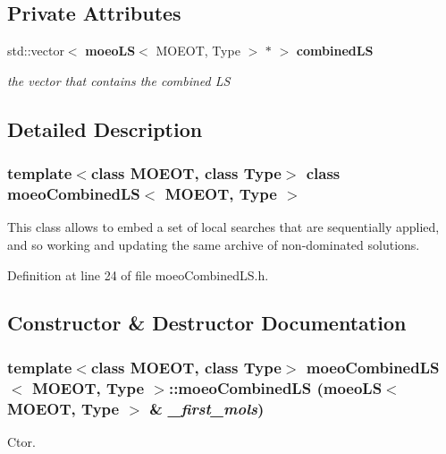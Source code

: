 \subsection*{Private Attributes}
\begin{CompactItemize}
\item 
std::vector$<$ {\bf moeo\-LS}$<$ MOEOT, Type $>$ $\ast$ $>$ {\bf combined\-LS}\label{classmoeoCombinedLS_3cf36ae7ada10d2837b60df01210d92a}

\begin{CompactList}\small\item\em the vector that contains the combined LS \item\end{CompactList}\end{CompactItemize}


\subsection{Detailed Description}
\subsubsection*{template$<$class MOEOT, class Type$>$ class moeo\-Combined\-LS$<$ MOEOT, Type $>$}

This class allows to embed a set of local searches that are sequentially applied, and so working and updating the same archive of non-dominated solutions. 



Definition at line 24 of file moeo\-Combined\-LS.h.

\subsection{Constructor \& Destructor Documentation}
\subsubsection{\setlength{\rightskip}{0pt plus 5cm}template$<$class MOEOT, class Type$>$ {\bf moeo\-Combined\-LS}$<$ MOEOT, Type $>$::{\bf moeo\-Combined\-LS} ({\bf moeo\-LS}$<$ MOEOT, Type $>$ \& {\em \_\-first\_\-mols})\hspace{0.3cm}{\tt  [inline]}}\label{classmoeoCombinedLS_5d09220b47bac67bd332dc0f93226ae1}


Ctor. 

